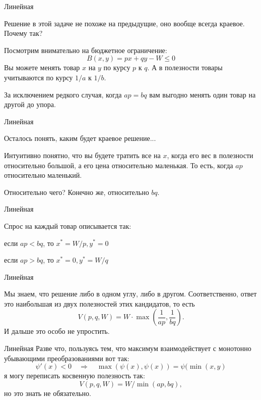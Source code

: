 \documentclass{beamer}
\begin{document}
\begin{frame}{Линейная}

Решение в этой задаче не похоже на предыдущие, оно вообще всегда краевое. 
Почему так? 

Посмотрим внимательно на бюджетное ограничение:
$$B(x,y) = px + qy - W \leqslant 0$$ 
Вы можете менять товар $x$ на $y$ по курсу $p$ к $q$. А в полезности товары учитываются по курсу $1/a$ к $1/b$. 

За исключением редкого случая, когда $ap = bq$ вам выгодно менять один товар на другой до упора.
\end{frame}

\begin{frame}{Линейная}

Осталось понять, каким будет краевое решение...

Интуитивно понятно, что вы будете тратить все на $x$, когда его вес в полезности относительно большой, а его цена относительно маленькая. То есть, когда $ap$ относительно маленький. 

Относительно чего? Конечно же, относительно $bq$.

\end{frame}

\begin{frame}{Линейная}

Спрос на каждый товар описывается так: 

если $ap < bq$, то $x^{\ast} = W/p, y^{\ast} = 0$

если $ap > bq$, то $x^{\ast} = 0, y^{\ast} = W/q$

%

\end{frame}

\begin{frame}{Линейная}

Мы знаем, что решение либо в одном углу, либо в другом. Соответственно, ответ это наибольшая из двух полезностей этих кандидатов, то есть
$$V(p,q,W) = W \cdot \max(\frac{1}{ap}, \frac{1}{bq}).$$
И дальше это особо не упростить.

\end{frame}

\begin{frame}{Линейная}
Разве что, пользуясь тем, что максимум взаимодействует с монотонно убывающими преобразованиями вот так:
$$ \psi'(x) < 0 \quad \Rightarrow \quad \max(\psi(x), \psi(x)) = \psi(\min(x, y)$$
я могу переписать косвенную полезность так:
$$V(p,q,W)  = W / \min(ap, bq),$$
но это знать не обязательно.
\end{frame}
\end{document}
